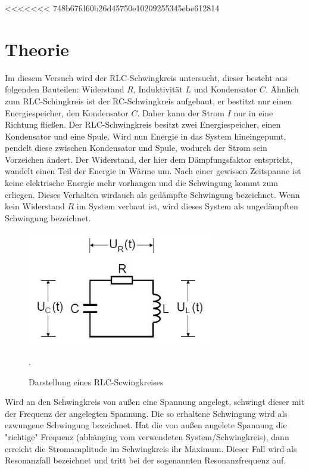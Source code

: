 <<<<<<< 748b67fd60b26d45750e10209255345ebe612814
\section{Theorie}
Im diesem Versuch wird der RLC-Schwingkreis untersucht, dieser besteht aus folgenden
Bauteilen: Widerstand $R$, Induktivität $L$ und Kondensator $C$.
Ähnlich zum RLC-Schingkreis ist der RC-Schwingkreis aufgebaut, er bestitzt nur einen
Energiespeicher, den Kondensator $C$. Daher kann der Strom $I$ nur in eine Richtung fließen.
Der RLC-Schwingkreis besitzt zwei Energiespeicher, einen Kondensator und eine
Spule. Wird nun Energie in das System hineingepumt, pendelt diese zwischen Kondensator und
Spule, wodurch der Strom sein Vorzeichen ändert. Der Widerstand, der hier dem
Dämpfungsfaktor entspricht, wandelt einen Teil der Energie in Wärme um. Nach einer
gewissen Zeitspanne ist keine elektrische Energie mehr vorhangen und die Schwingung
kommt zum erliegen. Dieses Verhalten wirdauch als gedämpfte Schwingung bezeichnet.
Wenn kein Widerstand $R$ im System verbaut ist, wird dieses System als
ungedämpften Schwingung bezeichnet.
\begin{figure}[H]
  \centering
  \includegraphics[height=5cm]{RLC.JPG}
  \caption{Darstellung eines RLC-Scwingkreises}
  \cite{skript}.
  \label{fig:RLC}
\end{figure}
Wird an den Schwingkreis von außen eine Spannung angelegt, schwingt dieser
mit der Frequenz der angelegten Spannung. Die so erhaltene Schwingung wird als
ezwungene Schwingung bezeichnet. Hat die von außen angelete Spannung die "richtige"
Frequenz (abhänging vom verwendeten System/Schwingkreis), dann erreicht die Stromamplitude im
Schwingkreis ihr Maximum. Dieser Fall wird als Resonanzfall bezeichnet und tritt bei der
sogenannten Resonanzfrequenz auf.

